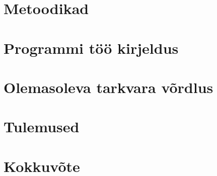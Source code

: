 \documentclass[12pt, a4paper]{report}
\begin{document}
\chapter{Metoodikad}\label{chapter:metoodika}


\chapter{Programmi töö kirjeldus}\label{chapter:kirjeldus}


\chapter{Olemasoleva tarkvara võrdlus}\label{chapter:soft}


\chapter{Tulemused}\label{chapter:tulemused}


\chapter{Kokkuvõte}\label{chapter:summary} 


\pagebreak
{}
{}
\printbibliography



\end{document}
